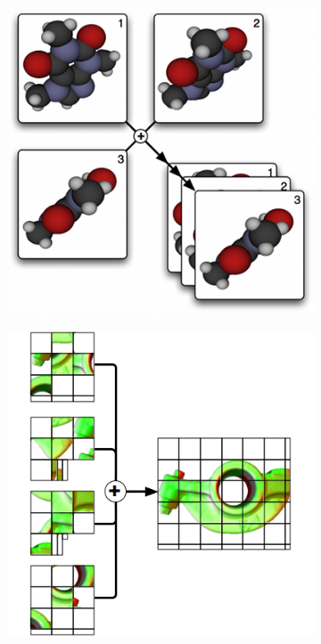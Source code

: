 \documentclass[10pt,journal,compsoc]{IEEEtran}
\begin{document}
\begin{figure}[ht]\center
  \begin{subfigure}[b]{0.24\textwidth}
    \includegraphics[width=\textwidth]{images/dplex}
  \end{subfigure}
  \begin{subfigure}[b]{0.24\textwidth}
    \includegraphics[width=\textwidth]{images/tile}

\end{subfigure}
\end{figure}
\end{document}
